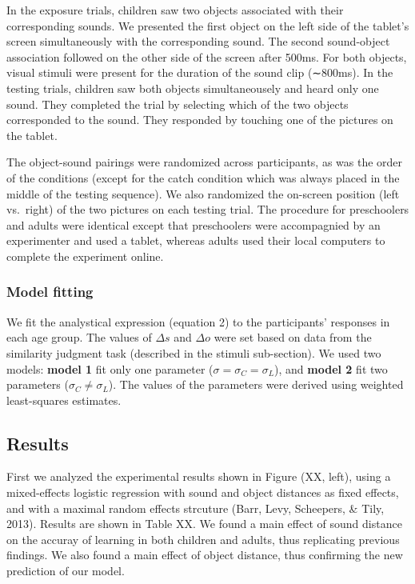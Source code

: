 \documentclass[10pt, letterpaper]{article}
\begin{document}
In the exposure trials, children saw two objects associated with their
corresponding sounds. We presented the first object on the left side of
the tablet's screen simultaneously with the corresponding sound. The
second sound-object association followed on the other side of the screen
after 500ms. For both objects, visual stimuli were present for the
duration of the sound clip (∼800ms). In the testing trials, children saw
both objects simultaneousely and heard only one sound. They completed
the trial by selecting which of the two objects corresponded to the
sound. They responded by touching one of the pictures on the tablet.

The object-sound pairings were randomized across participants, as was
the order of the conditions (except for the catch condition which was
always placed in the middle of the testing sequence). We also randomized
the on-screen position (left vs.~right) of the two pictures on each
testing trial. The procedure for preschoolers and adults were identical
except that preschoolers were accompagnied by an experimenter and used a
tablet, whereas adults used their local computers to complete the
experiment online.

\subsubsection{Model fitting}\label{model-fitting}

We fit the analystical expression (equation 2) to the participants'
responses in each age group. The values of \(\Delta s\) and \(\Delta o\)
were set based on data from the similarity judgment task (described in
the stimuli sub-section). We used two models: \textbf{model 1} fit only
one parameter (\(\sigma = \sigma_C =\sigma_L\)), and \textbf{model 2}
fit two parameters (\(\sigma_C \neq \sigma_L\)). The values of the
parameters were derived using weighted least-squares estimates.

\subsection{Results}\label{results}

First we analyzed the experimental results shown in Figure (XX, left),
using a mixed-effects logistic regression with sound and object
distances as fixed effects, and with a maximal random effects strcuture
(Barr, Levy, Scheepers, \& Tily, 2013). Results are shown in Table XX.
We found a main effect of sound distance on the accuray of learning in
both children and adults, thus replicating previous findings. We also
found a main effect of object distance, thus confirming the new
prediction of our model.
\end{document}
